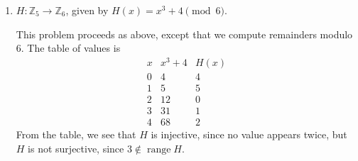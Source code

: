 \documentclass[12pt]{article}
\newcommand{\points}[1]{\marginpar{\hspace{24pt}[#1]}}
\newcommand{\Z}{\mathbb{Z}}
\begin{document}
\begin{enumerate}
\bigskip


 \item $H:\Z_5 \to \Z_6$, given by $H(x) = x^3+4 \pmod{6}$. \points{1}

\bigskip

This problem proceeds as above, except that we compute remainders modulo 6. The table of values is
\[
 \begin{array}{c|c|c}
  x&x^3+4&H(x)\\
\hline
 0&4&4\\
 1&5&5\\
 2&12&0\\
 3&31&1\\
 4&68&2
 \end{array}
\]
From the table, we see that $H$ is injective, since no value appears twice, but $H$ is not surjective, since $3\notin \operatorname{range}H$.
\end{enumerate}
\end{document}
